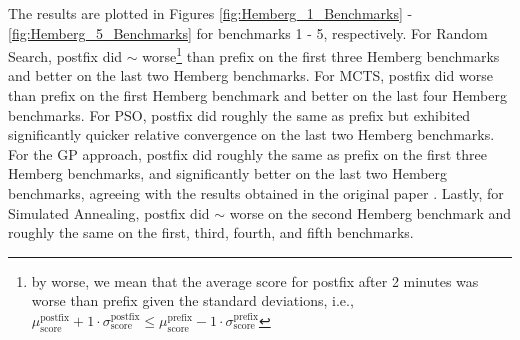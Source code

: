 \documentclass[runningheads]{llncs}
\begin{document}
\par The results are plotted in Figures \ref{fig:Hemberg_1_Benchmarks} - \ref{fig:Hemberg_5_Benchmarks} for benchmarks 1 - 5, respectively. For Random Search, postfix did $\sim$ worse\footnote{by worse, we mean that the average score for postfix after 2 minutes was worse than prefix given the standard deviations, i.e., $\mu_\mathrm{score}^\mathrm{postfix} + 1\cdot \sigma_\mathrm{score}^\mathrm{postfix} \leq \mu_\mathrm{score}^\mathrm{prefix} - 1\cdot \sigma_\mathrm{score}^\mathrm{prefix}$} than prefix on the first three Hemberg benchmarks and better on the last two Hemberg benchmarks. For MCTS, postfix did worse than prefix on the first Hemberg benchmark and better on the last four Hemberg benchmarks. For PSO, postfix did roughly the same as prefix but exhibited significantly quicker relative convergence on the last two Hemberg benchmarks. For the GP approach, postfix did roughly the same as prefix on the first three Hemberg benchmarks, and significantly better on the last two Hemberg benchmarks, agreeing with the results obtained in the original paper \cite{hemberg2008pre}. Lastly, for Simulated Annealing, postfix did $\sim$ worse on the second Hemberg benchmark and roughly the same on the first, third, fourth, and fifth benchmarks. 
\end{document}

